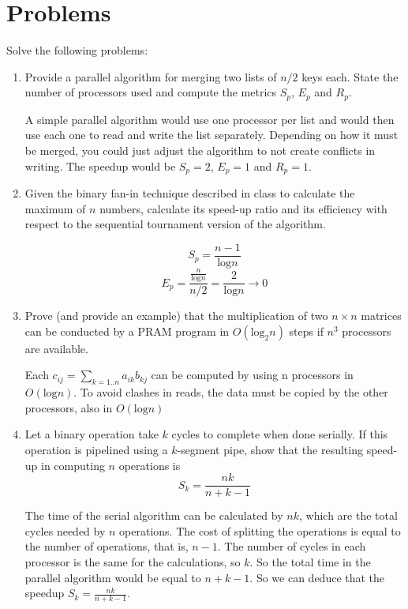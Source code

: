 \documentclass{article}
\begin{document}
\section{Problems}
Solve the following problems:
\begin{enumerate}
    \item Provide a parallel algorithm for merging two lists of $n/2$ keys each. State the number of processors used and compute the metrics $S_p$, $E_p$ and $R_p$.

    A simple parallel algorithm would use one processor per list and would then use each one to read and write the list separately. Depending on how it must be merged, you could just adjust the algorithm to not create conflicts in writing. The speedup would be $S_p = 2$, $E_p = 1$ and $R_p = 1$.

    \item Given the binary fan-in technique described in class to calculate the maximum of $n$ numbers, calculate its speed-up ratio and its efficiency with respect to the sequential tournament version of the algorithm.

    \begin{equation*}
        S_p = \frac{n -1}{\text{log} n}
    \end{equation*}
    \begin{equation*}
        E_p = \frac{\frac{n}{\text{log} n}}{n / 2} = \frac{2}{\text{log} n} \rightarrow 0
    \end{equation*}

    \item Prove (and provide an example) that the multiplication of two $n \times n$ matrices can be conducted by a PRAM program in $O(\text{log}_2 n)$ steps if $n^3$ processors are available.

    Each $c_{ij} = \sum_{k=1..n} a_{ik} b_{kj}$ can be computed by using n processors in $O(\text{log} n)$. To avoid clashes in reads, the data must be copied by the other processors, also in $O(\text{log} n)$

    \item Let a binary operation take $k$ cycles to complete when done serially. If this operation is pipelined using a $k$-segment pipe, show that the resulting speed-up in computing $n$ operations is
    \begin{equation*}
        S_k = \frac{nk}{n + k - 1}
    \end{equation*}

    The time of the serial algorithm can be calculated by $nk$, which are the total cycles needed by $n$ operations. The cost of splitting the operations is equal to the number of operations, that is, $n - 1$. The number of cycles in each processor is the same for the calculations, so $k$. So the total time in the parallel algorithm would be equal to $n + k -1$. So we can deduce that the speedup $S_k = \frac{nk}{n + k -1}$.

\end{enumerate}
\end{document}
